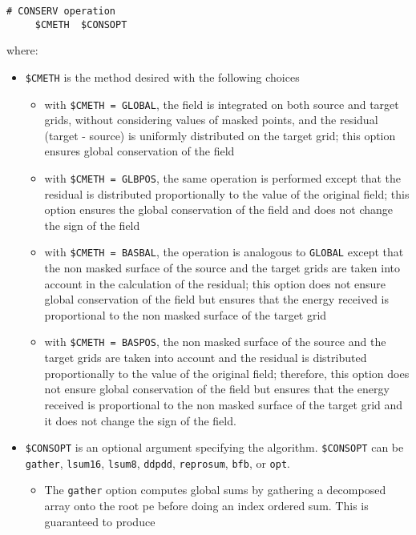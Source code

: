 \begin{itemize}
 \begin{verbatim}
# CONSERV operation
     $CMETH  $CONSOPT
\end{verbatim}
  \vspace{-0.5cm} where:
  \begin{itemize}
  \item {\tt \$CMETH} is the method desired with the following choices
    \begin{itemize}
    \item with {\tt \$CMETH = GLOBAL}, the field is integrated on both
      source and target grids, without considering values of masked
      points, and the residual (target - source) is uniformly
      distributed on the target grid; this option ensures global
      conservation of the field
    \item with {\tt \$CMETH = GLBPOS}, the same operation is performed
      except that the residual is distributed proportionally to the
      value of the original field; this option ensures the global
      conservation of the field and does not change the sign of the
      field
    \item with {\tt \$CMETH = BASBAL}, the operation is analogous to
      {\tt GLOBAL} except that the non masked surface of the source
      and the target grids are taken into account in the calculation
      of the residual; this option does not ensure global conservation
      of the field but ensures that the energy received is
      proportional to the non masked surface of the target grid
    \item with {\tt \$CMETH = BASPOS}, the non masked surface of the
      source and the target grids are taken into account and the
      residual is distributed proportionally to the value of the
      original field; therefore, this option does not ensure global
      conservation of the field but ensures that the energy received
      is proportional to the non masked surface of the target grid and
      it does not change the sign of the field.
    \end{itemize}
  \item {\tt \$CONSOPT} is an optional argument specifying the
    algorithm.  {\tt \$CONSOPT} can be {\tt gather}, {\tt lsum16}, {\tt lsum8},
    {\tt ddpdd}, {\tt reprosum}, {\tt bfb}, or {\tt opt}.  
\begin{itemize}
\item The {\tt gather} option computes global sums by gathering a decomposed array
  onto the root pe before doing an index ordered sum.  This is guaranteed to produce

\end{itemize}
\end{itemize}
\end{itemize}
